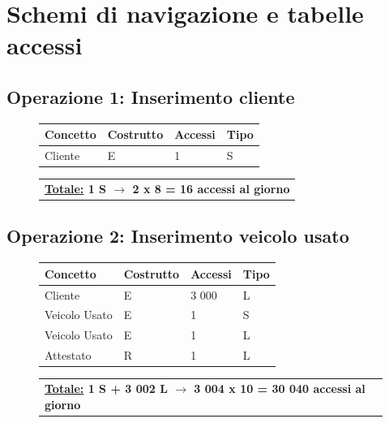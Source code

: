 \documentclass[a4paper,12pt]{report}
\begin{document}
\section{Schemi di navigazione e tabelle accessi}
\subsection*{Operazione 1: Inserimento cliente}
\begin{figure}[H]
	\centering
	\begin{tabular}{L{3cm}C{2cm}C{4.5cm}C{2cm}}
		\rule[-1.5mm]{0mm}{0.60cm}{}
		\textbf{Concetto} & \textbf{Costrutto} &\textbf{Accessi} & \textbf{Tipo} \\	
		\hline\rule[-2mm]{0mm}{0.65cm}{}
		Cliente & E & 1 & S \\
	\end{tabular}
	
	\begin{tabular}{C{12.9cm}}
		\rule[-3mm]{0mm}{0.85cm}{}	
		 \textbf{\underline{Totale:} 1 S $\to$ 2 x 8 = 16 accessi al giorno}
	\end{tabular}
\end{figure}

\subsection*{Operazione 2: Inserimento veicolo usato}
\begin{figure}[H]
	\centering
	\begin{tabular}{L{3cm}C{2cm}C{4.5cm}C{2cm}}
		\rule[-2mm]{0mm}{0.6cm}{}
		\textbf{Concetto} & \textbf{Costrutto} &\textbf{Accessi} & \textbf{Tipo} \\
		\hline\rule[-2mm]{0mm}{0.65cm}{}
		Cliente & E & 3 000 & L \\
		\hline\rule[-2mm]{0mm}{0.65cm}{}
		Veicolo Usato & E & 1 & S \\
		\hline\rule[-2mm]{0mm}{0.65cm}{}
		Veicolo Usato & E & 1 & L \\
		\hline\rule[-2mm]{0mm}{0.65cm}{}
		Attestato & R & 1 & L \\
	\end{tabular}
	
	\begin{tabular}{C{12.9cm}}
		\rule[-3mm]{0mm}{0.85cm}{}	
		 \textbf{\underline{Totale:} 1 S + 3 002 L $\to$ 3 004 x 10 = 30 040 accessi al giorno}
	\end{tabular}
\end{figure}
\end{document}
